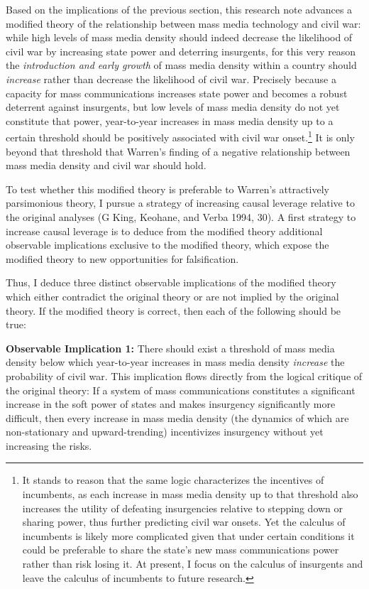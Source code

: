 \documentclass[11pt,article,oneside]{memoir}
\begin{document}
Based on the implications of the previous section, this research note
advances a modified theory of the relationship between mass media
technology and civil war: while high levels of mass media density should
indeed decrease the likelihood of civil war by increasing state power
and deterring insurgents, for this very reason the \emph{introduction
and early growth} of mass media density within a country should
\emph{increase} rather than decrease the likelihood of civil war.
Precisely because a capacity for mass communications increases state
power and becomes a robust deterrent against insurgents, but low levels
of mass media density do not yet constitute that power, year-to-year
increases in mass media density up to a certain threshold should be
positively associated with civil war onset.\footnote{It stands to reason
  that the same logic characterizes the incentives of incumbents, as
  each increase in mass media density up to that threshold also
  increases the utility of defeating insurgencies relative to stepping
  down or sharing power, thus further predicting civil war onsets. Yet
  the calculus of incumbents is likely more complicated given that under
  certain conditions it could be preferable to share the state's new
  mass communications power rather than risk losing it. At present, I
  focus on the calculus of insurgents and leave the calculus of
  incumbents to future research.} It is only beyond that threshold that
Warren's finding of a negative relationship between mass media density
and civil war should hold.

To test whether this modified theory is preferable to Warren's
attractively parsimonious theory, I pursue a strategy of increasing
causal leverage relative to the original analyses (G King, Keohane, and
Verba 1994, 30). A first strategy to increase causal leverage is to
deduce from the modified theory additional observable implications
exclusive to the modified theory, which expose the modified theory to
new opportunities for falsification.

Thus, I deduce three distinct observable implications of the modified
theory which either contradict the original theory or are not implied by
the original theory. If the modified theory is correct, then each of the
following should be true:

\textbf{Observable Implication 1:} There should exist a threshold of
mass media density below which year-to-year increases in mass media
density \emph{increase} the probability of civil war. This implication
flows directly from the logical critique of the original theory: If a
system of mass communications constitutes a significant increase in the
soft power of states and makes insurgency significantly more difficult,
then every increase in mass media density (the dynamics of which are
non-stationary and upward-trending) incentivizes insurgency without yet
increasing the risks.
\end{document}

